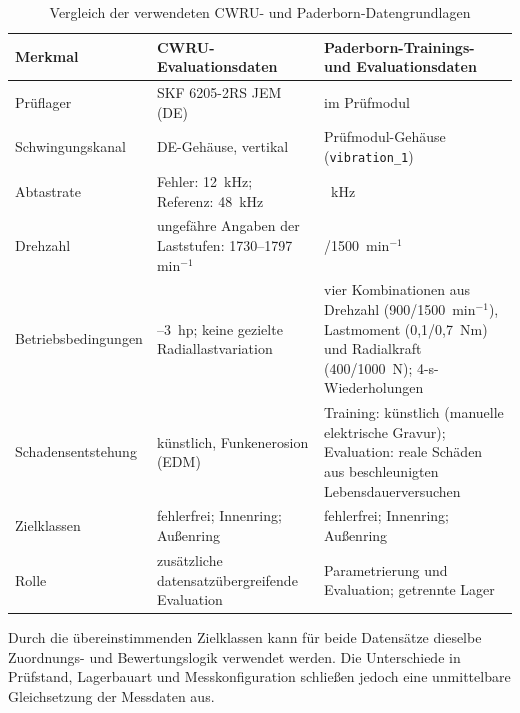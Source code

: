 \begin{table}[H]
  \centering
  \caption{Vergleich der verwendeten CWRU- und Paderborn-Datengrundlagen}
  \label{tab:vergleich_datensaetze}
  \small
  \setlength{\aboverulesep}{0pt}
  \setlength{\belowrulesep}{0pt}
  \setlength{\doublerulesep}{0pt}
  \renewcommand{\arraystretch}{1.25}
  \begin{tabularx}{\textwidth}{|l|
    >{\raggedright\arraybackslash}X|
    >{\raggedright\arraybackslash}X|}
    \hline
    \textbf{Merkmal} & \textbf{CWRU-Evaluationsdaten} &
    \textbf{Paderborn-Trainings- und Evaluationsdaten} \\
    \toprule
    \toprule
    Prüflager & SKF 6205-2RS JEM (DE) & 6203 im Prüfmodul \\
    \hline
    Schwingungskanal & DE-Gehäuse, vertikal & Prüfmodul-Gehäuse
    (\texttt{vibration\_1}) \\
    \hline
    Abtastrate & Fehler: 12~kHz; Referenz: 48~kHz & 64~kHz \\
    \hline
    Drehzahl & ungefähre Angaben der Laststufen:
    1730--1797~$\mathrm{min^{-1}}$ &
    900/1500~$\mathrm{min^{-1}}$ \\
    \hline
    Betriebsbedingungen & 0--3~hp; keine gezielte Radiallastvariation &
    vier Kombinationen aus Drehzahl (900/1500~$\mathrm{min^{-1}}$),
    Lastmoment (0,1/0,7~Nm) und Radialkraft (400/1000~N);
    4-s-Wiederholungen \\
    \hline
    Schadensentstehung & künstlich, Funkenerosion (EDM) &
    Training: künstlich (manuelle elektrische Gravur); Evaluation: reale
    Schäden aus beschleunigten Lebensdauerversuchen \\
    \hline
    Zielklassen & fehlerfrei; Innenring; Außenring &
    fehlerfrei; Innenring; Außenring \\
    \hline
    Rolle & zusätzliche datensatzübergreifende Evaluation &
    Parametrierung und Evaluation; getrennte Lager \\
    \hline
  \end{tabularx}
\end{table}

\begin{samepage}
Durch die übereinstimmenden Zielklassen kann für beide Datensätze dieselbe
Zuordnungs- und Bewertungslogik verwendet werden. Die Unterschiede in
Prüfstand, Lagerbauart und Messkonfiguration schließen jedoch eine unmittelbare
Gleichsetzung der Messdaten aus.

\end{samepage}

